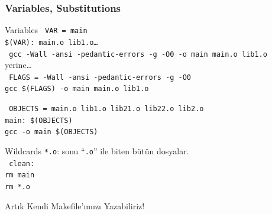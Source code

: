 \documentclass{beamer}
\begin{document}
\subsubsection{Variables, Substitutions}
\begin{frame}
    {Variables}
    \texttt{%
        VAR = main\\
        \$(VAR): main.o lib1.o\ldots}\\
        \vspace{5mm}
        \pause{}
    \texttt{%
        gcc -Wall -ansi -pedantic-errors -g -O0 -o main main.o lib1.o}\\
        \vspace{2mm}
        yerine\ldots\\
        \vspace{2mm}
    \texttt{%
        FLAGS = -Wall -ansi -pedantic-errors -g -O0\\
        gcc \$(FLAGS) -o main main.o lib1.o}
        
\end{frame}

\begin{frame}
    \texttt{%
        OBJECTS = main.o lib1.o lib21.o lib22.o lib2.o\\
        main: \$(OBJECTS)\\
        \hspace{10mm}   gcc -o main \$(OBJECTS)}
\end{frame}

\begin{frame}
    {Wildcards}
    \texttt{*.o}: sonu ``\texttt{.o}'' ile biten bütün dosyalar.\\
    \vspace{5mm}
    \texttt{%
        clean:\\
        \hspace{10mm}   rm main\\
        \hspace{10mm}   rm *.o\\}


    
\end{frame}
{
\begin{frame}
    {Artık Kendi Makefile'ımızı Yazabiliriz!}
\end{frame}
}
\end{document}

